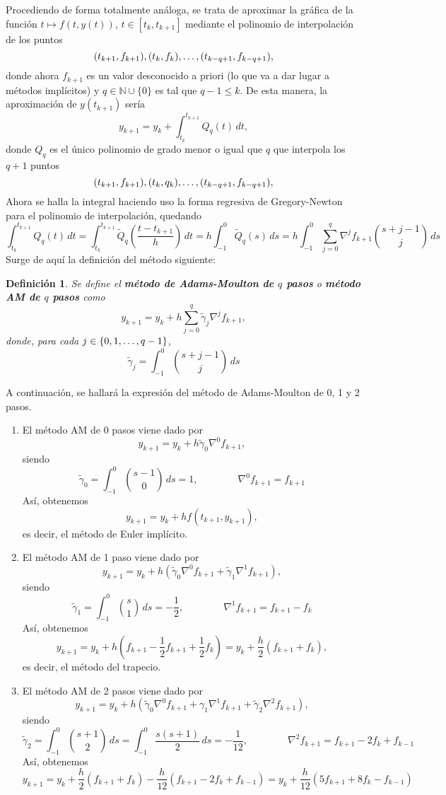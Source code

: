 \documentclass[11pt]{report}
\theoremstyle{mytheorem}
\theoremstyle{mydefinition}
\newtheorem{definition}{Definición}
\theoremstyle{myexample}
\newenvironment{cdefinition} %
  {\begin{mdframed}[
        linewidth=3pt,
        linecolor=c1,
        bottomline=false,
        topline=false,
        rightline=false,
        innerrightmargin=0pt,
        innertopmargin=0pt,
        innerbottommargin=0pt,
        innerleftmargin=1em, %
        skipabove=\baselineskip]
    \begin{definition}}
  {\end{definition}\end{mdframed}}
\newcommand{\N}{\mathbb N}
\newcommand{\mybf}[1]{\boldmath\textbf{\color{c1}#1}\unboldmath}
\begin{document}
Procediendo de forma totalmente análoga, se trata de aproximar la gráfica de la función $t \mapsto f(t,y(t))$, $t \in [t_k,t_{k+1}]$ mediante el polinomio de interpolación de los puntos
\[(t_{k+1},f_{k+1}), (t_{k},f_{k}), \mathellipsis, (t_{k-q+1}, f_{k-q+1}),\]
donde ahora $f_{k+1}$ es un valor desconocido a priori (lo que va a dar lugar a métodos implícitos) y $q \in \N \cup \{0\}$ es tal que $q-1 \leq k$. De esta manera, la aproximación de $y(t_{k+1})$ sería
\[y_{k+1}=y_k+\int_{t_k}^{t_{k+1}}Q_{q}(t) \, dt,\]
donde $Q_q$ es el único polinomio de grado menor o igual que $q$ que interpola los $q+1$ puntos
\[(t_{k+1},f_{k+1}), (t_{k},q_{k}), \mathellipsis, (t_{k-q+1}, f_{k-q+1}),\]
Ahora se halla la integral haciendo uso la forma regresiva de Gregory-Newton para el polinomio de interpolación, quedando
\[\int_{t_k}^{t_{k+1}}Q_q(t) \, dt = \int_{t_k}^{t_{k+1}} \widetilde{Q}_{q}\left(\frac{t-t_{k+1}}{h}\right) \, dt = h \int_{-1}^0 \widetilde{Q}_{q}(s) \, ds = h \int_{-1}^0 \sum_{j=0}^{q}\nabla^jf_{k+1}\binom{s+j-1}{j} \, ds\]
Surge de aquí la definición del método siguiente:

\begin{cdefinition}
Se define el \mybf{método de Adams-Moulton de $q$ pasos} o \mybf{método AM de $q$ pasos} como
\[y_{k+1}=y_k+h\sum_{j=0}^{q}\widetilde{\gamma}_j\nabla^j f_{k+1},\]
donde, para cada $j \in \{0,1,\mathellipsis,q-1\}$,
\[\widetilde{\gamma}_j = \int_{-1}^0 \binom{s+j-1}{j} \, ds\]

\end{cdefinition}

A continuación, se hallará la expresión del método de Adams-Moulton de 0, 1 y 2 pasos.

\begin{enumerate}
    \item El método AM de 0 pasos viene dado por
    \[y_{k+1} = y_k+h\widetilde{\gamma}_0\nabla^0f_{k+1},\]
    siendo
    \[\widetilde{\gamma}_0 = \int_{-1}^0 \binom{s-1}{0} \, ds = 1, \qquad \qquad \nabla^0f_{k+1} = f_{k+1}\]
    Así, obtenemos
    \[y_{k+1}=y_k+hf(t_{k+1},y_{k+1}),\]
    es decir, el método de Euler implícito.
    \item El método AM de 1 paso viene dado por
    \[y_{k+1} = y_k+h\left(\widetilde{\gamma}_0\nabla^0f_{k+1}+\widetilde{\gamma}_1\nabla^1f_{k+1}\right),\]
    siendo
    \[\widetilde{\gamma}_1 = \int_{-1}^0\binom{s}{1} \, ds = -\frac{1}{2}, \qquad \qquad \nabla^1f_{k+1} = f_{k+1}-f_{k}\]
    Así, obtenemos
    \[y_{k+1}=y_k+h\left(f_{k+1}-\frac{1}{2}f_{k+1}+\frac{1}{2}f_{k}\right) = y_k+\frac{h}{2}\left(f_{k+1}+f_{k}\right),\]
    es decir, el método del trapecio.
    \item El método AM de 2 pasos viene dado por
    \[y_{k+1} = y_k+h\left(\widetilde{\gamma}_0\nabla^0f_{k+1}+\gamma_1\nabla^1f_{k+1}+\widetilde{\gamma}_2\nabla^2f_{k+1}\right),\]
    siendo
    \[\widetilde{\gamma}_2 = \int_{-1}^0 \binom{s+1}{2} \, ds = \int_{-1}^0\frac{s(s+1)}{2} \, ds=- \frac{1}{12}, \qquad \qquad \nabla^2f_{k+1} = f_{k+1}-2f_{k}+f_{k-1}\]
    Así, obtenemos
    \[y_{k+1}= y_k+\frac{h}{2}\left(f_{k+1}+f_k\right)-\frac{h}{12}\left(f_{k+1}-2f_{k}+f_{k-1}\right) = y_k+\frac{h}{12}\left(5f_{k+1}+8f_k-f_{k-1}\right)\]
\end{enumerate}
\end{document}
